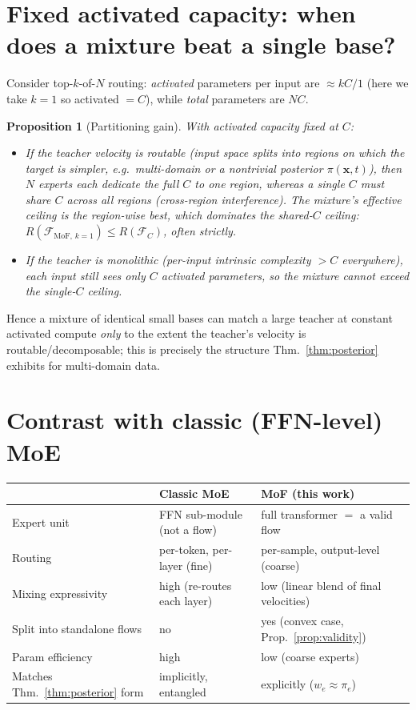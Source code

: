 \documentclass[11pt,a4paper]{article}
\newcommand{\Fc}{\mathcal{F}_C}
\newcommand{\xvec}{\bm{x}}
\newtheorem{proposition}{Proposition}
\begin{document}
\section{Fixed activated capacity: when does a mixture beat a single base?}

Consider top-$k$-of-$N$ routing: \emph{activated} parameters per input are $\approx kC/1$ (here we take
$k{=}1$ so activated $=C$), while \emph{total} parameters are $NC$.

\begin{proposition}[Partitioning gain]\label{prop:partition}
With activated capacity fixed at $C$:
\begin{itemize}[leftmargin=1.4em]
  \item If the teacher velocity is \emph{routable} (input space splits into regions on which the
  target is simpler, e.g.\ multi-domain or a nontrivial posterior $\pi(\xvec,t)$), then $N$ experts each
  dedicate the full $C$ to one region, whereas a single $C$ must \emph{share} $C$ across all regions
  (cross-region interference). The mixture's effective ceiling is the \emph{region-wise} best, which
  dominates the shared-$C$ ceiling: $R(\mathcal F_{\text{MoF},\,k{=}1})\le R(\Fc)$, often strictly.
  \item If the teacher is \emph{monolithic} (per-input intrinsic complexity $>C$ everywhere), each
  input still sees only $C$ activated parameters, so the mixture cannot exceed the single-$C$ ceiling.
\end{itemize}
\end{proposition}

\noindent Hence a mixture of identical small bases can match a large teacher at constant activated
compute \emph{only} to the extent the teacher's velocity is routable/decomposable; this is precisely
the structure Thm.~\ref{thm:posterior} exhibits for multi-domain data.

\section{Contrast with classic (FFN-level) MoE}

\begin{center}
\begin{tabular}{@{}lll@{}}
\toprule
 & \textbf{Classic MoE} & \textbf{MoF (this work)} \\
\midrule
Expert unit & FFN sub-module (not a flow) & full transformer $=$ a valid flow \\
Routing & per-token, per-layer (fine) & per-sample, output-level (coarse) \\
Mixing expressivity & high (re-routes each layer) & low (linear blend of final velocities) \\
Split into standalone flows & no & yes (convex case, Prop.~\ref{prop:validity}) \\
Param efficiency & high & low (coarse experts) \\
Matches Thm.~\ref{thm:posterior} form & implicitly, entangled & explicitly ($w_e\!\approx\!\pi_e$) \\
\bottomrule
\end{tabular}
\end{center}
\end{document}
